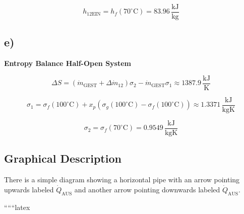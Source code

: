 \[
h_{\text{12EIN}} = h_f(70^\circ \text{C}) = 83.96 \, \frac{\text{kJ}}{\text{kg}}
\]

\subsection*{e)}
\textbf{Entropy Balance Half-Open System}

\[
\Delta S = \left( \dot{m}_{\text{GEST}} + \Delta \dot{m}_{12} \right) \sigma_2 - \dot{m}_{\text{GEST}} \sigma_1 \approx 1387.9 \, \frac{\text{kJ}}{\text{K}}
\]

\[
\sigma_1 = \sigma_f(100^\circ \text{C}) + x_p \left( \sigma_g(100^\circ \text{C}) - \sigma_f(100^\circ \text{C}) \right) \approx 1.3371 \, \frac{\text{kJ}}{\text{kgK}}
\]

\[
\sigma_2 = \sigma_f(70^\circ \text{C}) = 0.9549 \, \frac{\text{kJ}}{\text{kgK}}
\]

\subsection*{Graphical Description}
There is a simple diagram showing a horizontal pipe with an arrow pointing upwards labeled $\dot{Q}_{\text{AUS}}$ and another arrow pointing downwards labeled $\dot{Q}_{\text{AUS}}$.

``````latex


